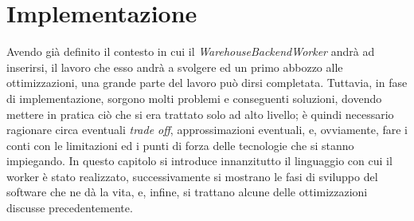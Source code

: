 \chapter{Implementazione} \label{implementazione}
Avendo già definito il contesto in cui il \textit{WarehouseBackendWorker} andrà ad inserirsi, il lavoro che esso andrà a svolgere ed un primo abbozzo alle ottimizzazioni, una grande parte del lavoro può dirsi completata. Tuttavia, in fase di implementazione, sorgono molti problemi e conseguenti soluzioni, dovendo mettere in pratica ciò che si era trattato solo ad alto livello; è quindi necessario ragionare circa eventuali \textit{trade off}, approssimazioni eventuali, e, ovviamente, fare i conti con le limitazioni ed i punti di forza delle tecnologie che si stanno impiegando. In questo capitolo si introduce innanzitutto il linguaggio con cui il worker è stato realizzato, successivamente si mostrano le fasi di sviluppo del software che ne dà la vita, e, infine, si trattano alcune delle ottimizzazioni discusse precedentemente.
